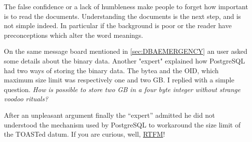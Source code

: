 The false confidence or a lack of humbleness make people to forget how important is to read the documents. 
Understanding the documents is the next step, and is not simple indeed. In particular if the background is 
poor or the reader have preconceptions which alter the word meanings.\newline

On the same message board mentioned in \ref{sec:DBAEMERGENCY} an user asked some details about the binary 
data. Another "expert" explained how PostgreSQL had two ways of storing the binary data. The bytea and the 
OID, which maximum size limit was respectively  one and two GB. I replied with a simple question. 
\textit{How is possible to store two GB in a four byte integer without strange voodoo 
rituals?}\newline

After an unpleasant argument finally the ``expert'' admitted he did not understood the mechanism used by 
PostgreSQL to workaround the size limit of the TOASTed datum. If you are curious, well, 
\href{http://www.postgresql.org/docs/9.3/static/largeobjects.html}{RTFM}!

